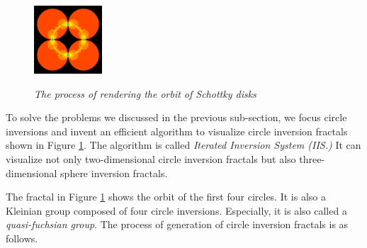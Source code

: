 \begin{figure}[htbp]
\begin{minipage}[t]{0.16\hsize}
  \subcaption{}
  \label{fig:level2}
 \end{minipage}
 \begin{minipage}[t]{0.16\hsize}
  \center
  \includegraphics[width=1in, height=1in, keepaspectratio]{img/preparation/orbit/levelMaxc.pdf}
  \subcaption{}
  \label{fig:levelMax}
 \end{minipage}
 \caption{\textit{The process of rendering the orbit of Schottky disks}}
 \label{fig:schottkyProcess}
\end{figure}

\noindent To solve the problems we discussed in the previous sub-section,
we focus circle inversions and invent an efficient algorithm to
visualize circle inversion fractals shown in Figure \ref{fig:schottkyProcess}.
The algorithm is called \textit{Iterated Inversion System (IIS.)}
It can visualize not only two-dimensional circle inversion fractals but
also three-dimensional sphere inversion fractals.

The fractal in Figure \ref{fig:schottkyProcess} shows the orbit of the first
four circles. %
It is also a Kleinian group composed of four circle inversions.
Especially, it is also called a \textit{quasi-fuchsian group}.
The process of generation of circle inversion fractals is
as follows.

